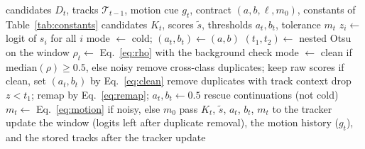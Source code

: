 \begin{algorithm}[t]
\caption{\scl{} for frame $t$; the comments name the steps of Fig.~\ref{fig:arch}. The window
holds the logits of frames $t-W$ to $t-1$, so the decision for frame $t$ uses no future frame.}\label{alg:layer}
\begin{algorithmic}[1]
\Require candidates $D_t$, tracks $\mathcal{T}_{t-1}$, motion cue $g_t$, contract $(a,b,\ell,m_0)$, constants of Table~\ref{tab:constants}
\Ensure candidates $K_t$, scores $\tilde{s}$, thresholds $a_t,b_t$, tolerance $m_t$
\State $z_i\gets$ logit of $s_i$ for all $i$ 
 
  \State mode $\gets$ cold; $(a_t,b_t)\gets(a,b)$
\Else
  \State $(t_1,t_2)\gets$ nested Otsu on the window 
  \State $\rho_t\gets$ Eq.~\eqref{eq:rho} with the background check
  \State mode $\gets$ clean if $\mathrm{median}(\rho)\ge0.5$, else noisy 
\EndIf
{} 
  \State remove cross-class duplicates; keep raw scores
  \State if clean, set $(a_t,b_t)$ by Eq.~\eqref{eq:clean}
\Else {}
  \State remove duplicates with track context
  \State drop $z<t_1$; remap by Eq.~\eqref{eq:remap}; $a_t,b_t\gets0.5$
\EndIf
\State rescue continuations (not cold) 
\State $m_t\gets$ Eq.~\eqref{eq:motion} if noisy, else $m_0$ 
\State pass $K_t$, $\tilde{s}$, $a_t$, $b_t$, $m_t$ to the tracker
\State update the window (logits left after duplicate removal), the motion history ($g_t$), and the stored tracks after the tracker update
\end{algorithmic}
\end{algorithm}

